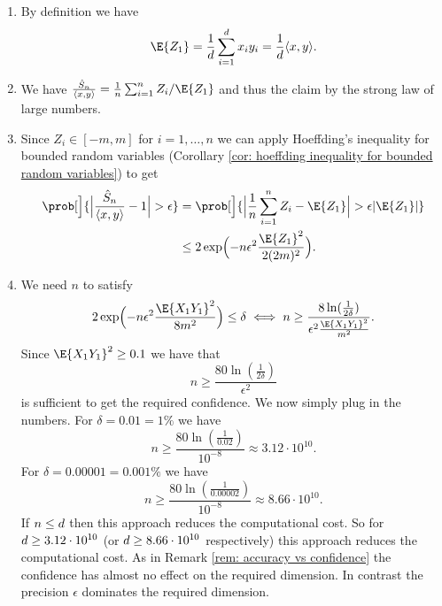 \begin{solution}
\begin{enumerate}[wide=0pt]
    \item[\ref{it: (randomized linear algebra) expectation}]
    By definition we have
    \[
        \E{Z_1} = \frac1\dims\sum_{i=1}^\dims  x_i y_i = \frac1\dims \scp{x,y}.
    \]            

    \item[\ref{it: (randomized linear algebra) convergence}]
    We have \(\frac{\hat S_n}{\scp{x,y}} = \frac1n \sum_{i=1}^n Z_i /
    \E{Z_1}\) and thus the claim by the strong law of large numbers.

    \item[\ref{it: (randomized linear algebra) PAC bound}]
    Since \(Z_i \in [-m,m]\) for \(i=1, \ldots, n\) we can apply
    Hoeffding's inequality for bounded random variables (Corollary \ref{cor:
    hoeffding inequality for bounded random variables}) to get
    \begin{align*}
        \prob[\Big]{\abs[\Big]{\frac{\hat S_n}{\scp{x,y}} - 1} > \epsilon}
        &=\prob[\Big]{\abs[\Big]{\frac1n\sum_{i=1}^n Z_i - \E{Z_1}} > \epsilon \abs{\E{Z_1}}}
        \\
        &\le 2\exp\Bigl(-n \epsilon^2 \frac{\E{Z_1}^2}{2(2m)^2}\Bigr).
    \end{align*}

    \item[\ref{it: (randomized linear algebra) sample complexity}]
    We need \(n\) to satisfy
    \[
        2\exp\Bigl(-n \epsilon^2 \frac{\E{X_1 Y_1}^2}{8 m^2}\Bigr) \le \delta 
        \iff n \ge \frac{8\ln(\frac1{2\delta})}{\epsilon^2 \frac{\E{X_1 Y_1}^2}{m^2}}.
    \]
    Since \(\E{X_1 Y_1}^2 \ge 0.1\) we have that
    \[
        n \ge \frac{80\ln(\frac1{2\delta})}{\epsilon^2}
    \]
    is sufficient to get the required confidence. We now simply
    plug in the numbers. For \(\delta = 0.01 = 1\%\) we have
    \[
        n \ge \frac{80\ln(\frac1{0.02})}{10^{-8}} \approx 3.12 \cdot 10^{10}.
    \]
    For \(\delta = 0.00001 = 0.001\%\) we have
    \[
        n \ge \frac{80\ln(\frac1{0.00002})}{10^{-8}} \approx 8.66 \cdot 10^{10}.
    \]
    If \(n\le d\) then this approach reduces the computational cost.
    So for \(d \ge 3.12 \cdot 10^{10}\) (or \(d \ge 8.66 \cdot 10^{10}\) respectively)
    this approach reduces the computational cost. As in Remark \ref{rem:
    accuracy vs confidence} the confidence has almost no effect on the
    required dimension. In contrast the precision \(\epsilon\)
    dominates the required dimension.
    \qedhere
\end{enumerate}
\end{solution}
